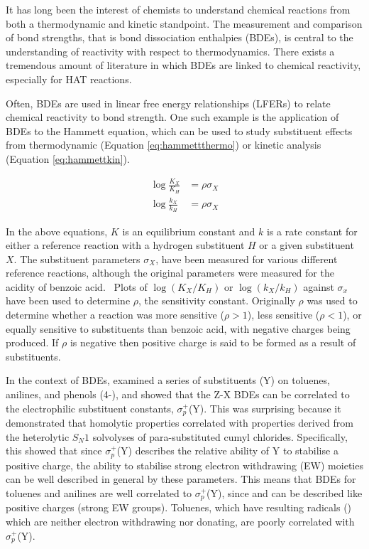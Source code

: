 It has long been the interest of chemists to understand chemical reactions from
both a thermodynamic and kinetic standpoint. The measurement and comparison of
bond strengths, that is bond dissociation enthalpies (BDEs), is central to the
understanding of reactivity with respect to thermodynamics. There exists a
tremendous amount of literature in which BDEs are linked to chemical reactivity,
especially for HAT
reactions.\cite{Kochi1973,Tedder1982,Wijtmans2003,Pratt2004,Mayer2004}

Often, BDEs are used in linear free energy relationships (LFERs) to relate
chemical reactivity to bond strength. One such example\cite{Pratt2004} is the
application of BDEs to the Hammett equation\cite{Anslyn2006}, which can be used
to study substituent effects from thermodynamic (Equation
\ref{eq:hammettthermo}) or kinetic analysis (Equation \ref{eq:hammettkin}).

\begin{align}
 \log\frac{K_X}{K_H} &= \rho \sigma_X \label{eq:hammettthermo} \\
 \log\frac{k_X}{k_H} &= \rho \sigma_X \label{eq:hammettkin}
\end{align}

\noindent In the above equations, $K$ is an equilibrium constant and $k$ is a
rate constant for either a reference reaction with a hydrogen substituent $H$ or
a given substituent $X$. The substituent parameters $\sigma_X$, have been
measured for various different reference reactions, although the original
parameters were measured for the acidity of benzoic acid.\cite{Hammett1937}
~Plots of $\log(K_X/K_H)$ or $\log(k_X/k_H)$ against $\sigma_x$ have been used
to determine $\rho$, the sensitivity constant. Originally $\rho$ was used to
determine whether a reaction was more sensitive ($\rho > 1$), less sensitive
($\rho < 1$), or equally sensitive to substituents than benzoic acid, with
negative charges being produced. If $\rho$ is negative then positive charge is
said to be formed as a result of substituents.

In the context of BDEs, \citet{Pratt2004} examined a series of substituents (Y)
on toluenes, anilines, and phenols (4-), and showed that the Z-X
BDEs can be correlated to the electrophilic substituent constants,
$\sigma_p^+$(Y). This was surprising because it demonstrated that homolytic
properties correlated with properties derived from the heterolytic $S_N1$
solvolyses of para-substituted cumyl chlorides.\cite{Brown1958} Specifically,
this showed that since $\sigma_p^+$(Y) describes the relative ability of Y to
stabilise a positive charge, the ability to stabilise strong electron
withdrawing (EW) moieties can be well described in general by these
parameters. This means that BDEs for toluenes and anilines are well correlated
to $\sigma_p^+$(Y), since  and  can be described like positive
charges (strong EW groups). Toluenes, which have resulting radicals ()
which are neither electron withdrawing nor donating, are poorly correlated with
$\sigma_p^+$(Y).

